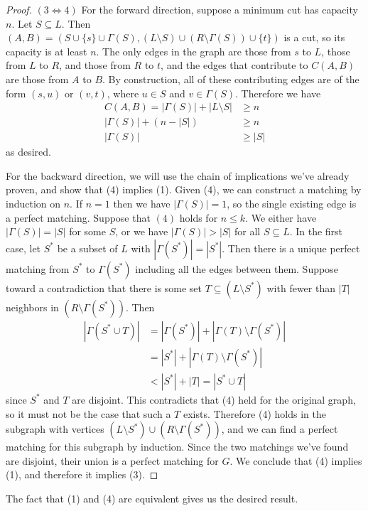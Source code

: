 \documentclass[11pt]{article}
\begin{document}
\begin{proof}
  $(3 \iff 4)$ For the forward direction, suppose a minimum cut has capacity $n$.
  Let $S \subseteq L$.
  Then $(A, B) = (S \cup \{s\} \cup \Gamma(S), (L \setminus S) \cup (R \setminus \Gamma(S)) \cup \{t\})$ is a cut, so its capacity is at least $n$.
  The only edges in the graph are those from $s$ to $L$, those from $L$ to $R$, and those from $R$ to $t$, and the edges that contribute to $C(A, B)$ are those from $A$ to $B$.
  By construction, all of these contributing edges are of the form $(s, u)$ or $(v, t)$, where $u \in S$ and $v \in \Gamma(S)$.
  Therefore we have
  \begin{align*}
    C(A, B) = |\Gamma(S)| + |L \setminus S| &\geq n\\
    |\Gamma(S)| + (n - |S|) &\geq n\\
    |\Gamma(S)| &\geq |S|
  \end{align*} as desired.

  For the backward direction, we will use the chain of implications we've already proven, and show that (4) implies (1).
  Given (4), we can construct a matching by induction on $n$.
  If $n = 1$ then we have $|\Gamma(S)| = 1$, so the single existing edge is a perfect matching.
  Suppose that $(4)$ holds for $n \leq k$.
  We either have $|\Gamma(S)| = |S|$ for some $S$, or we have $|\Gamma(S)| > |S|$ for all $S \subseteq L$.
  In the first case, let $S^*$ be a subset of $L$ with $|\Gamma(S^*)| = |S^*|$.
  Then there is a unique perfect matching from $S^*$ to $\Gamma(S^*)$ including all the edges between them.
  Suppose toward a contradiction that there is some set $T \subseteq (L \setminus S^*)$ with fewer than $|T|$ neighbors in $(R \setminus \Gamma(S^*))$.
  Then
  \begin{align*}
    |\Gamma(S^* \cup T)| &= |\Gamma(S^*)| + |\Gamma(T) \setminus \Gamma(S^*)|\\
    &= |S^*| + |\Gamma(T) \setminus \Gamma(S^*)|\\
    &< |S^*| + |T| = |S^* \cup T|
  \end{align*} since $S^*$ and $T$ are disjoint.
  This contradicts that (4) held for the original graph, so it must not be the case that such a $T$ exists.
  Therefore (4) holds in the subgraph with vertices $(L \setminus S^*) \cup (R \setminus \Gamma(S^*))$, and we can find a perfect matching for this subgraph by induction.
  Since the two matchings we've found are disjoint, their union is a perfect matching for $G$.
  We conclude that (4) implies (1), and therefore it implies (3).
\end{proof}

The fact that (1) and (4) are equivalent gives us the desired result.
\end{document}
